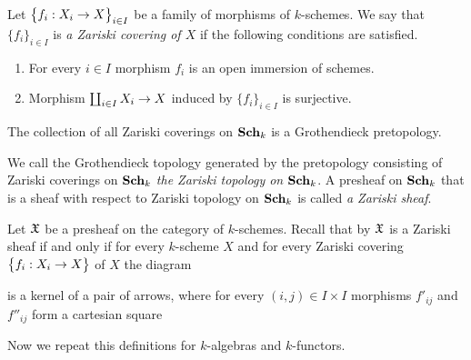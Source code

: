 \begin{definition}
Let $\big\{f_i:X_i\rightarrow X\big\}_{i\in I}$ be a family of morphisms of $k$-schemes. We say that $\{f_i\}_{i\in I}$ is \textit{a Zariski covering of $X$} if the following conditions are satisfied.
\begin{enumerate}[label=\textbf{(\arabic*)}, leftmargin=1.5em]
\item For every $i\in I$ morphism $f_i$ is an open immersion of schemes.
\item Morphism $\coprod_{i\in I}X_i\rightarrow X$ induced by $\big\{f_i\big\}_{i\in I}$ is surjective.
\end{enumerate}
\end{definition}
\noindent
The collection of all Zariski coverings on $\mathbf{Sch}_k$ is a Grothendieck pretopology.

\begin{definition}
We call the Grothendieck topology generated by the pretopology consisting of Zariski coverings on $\mathbf{Sch}_k$ \textit{the Zariski topology on $\mathbf{Sch}_k$}. A presheaf on $\mathbf{Sch}_k$ that is a sheaf with respect to Zariski topology on $\mathbf{Sch}_k$ is called \textit{a Zariski sheaf}.
\end{definition}
\noindent
Let ${\mathfrak X}$ be a presheaf on the category of $k$-schemes. Recall that by {\cite[Theorem 3.5]{Sheaves}} ${\mathfrak X}$ is a Zariski sheaf if and only if for every $k$-scheme $X$ and for every Zariski covering $\big\{f_i:X_i\rightarrow X\big\}$ of $X$ the diagram
\begin{center}
\end{center}
is a kernel of a pair of arrows, where for every $(i,j)\in I\times I$ morphisms $f'_{ij}$ and $f''_{ij}$ form a cartesian square
\begin{center}
\end{center}
\noindent
Now we repeat this definitions for $k$-algebras and $k$-functors.

